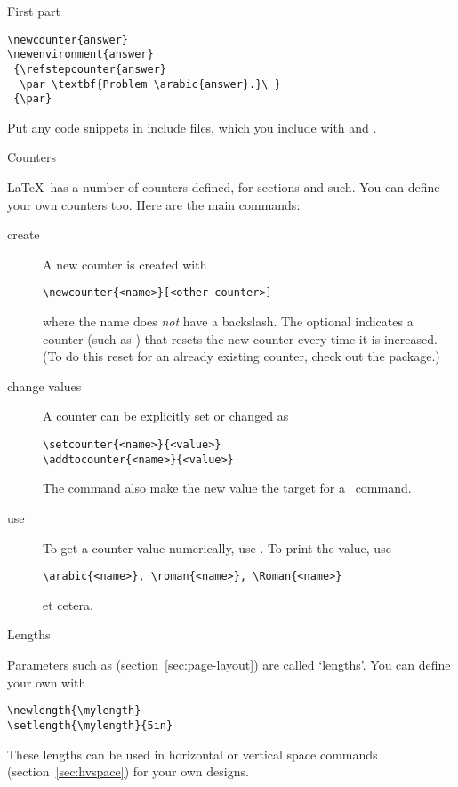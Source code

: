 \begin{answer}
First part
\begin{verbatim}
\newcounter{answer}
\newenvironment{answer}
 {\refstepcounter{answer}
  \par \textbf{Problem \arabic{answer}.}\ }
 {\par}
\end{verbatim}
Put any code snippets in include files, which you include
with  and .
\end{answer}

 {Counters}
\label{sec:counter}

\LaTeX\ has a number of counters defined, for sections and such. You
can define your own counters too. Here are the main commands:
\begin{description}
\item[create] A new counter is created with
\begin{verbatim}
\newcounter{<name>}[<other counter>]
\end{verbatim}
where the name does {\em not} have a backslash. The optional  indicates a counter (such as ) that resets the
new counter every time it is increased. (To do this reset for an
already existing counter, check out the  package.)
\item[change values] A counter can be explicitly set or changed as
\begin{verbatim}
\setcounter{<name>}{<value>}
\addtocounter{<name>}{<value>}
\end{verbatim}
The command  also make the new value the target for
a~ command.
\item[use] To get a counter value numerically, use . To
  print the value, use
\begin{verbatim}
\arabic{<name>}, \roman{<name>}, \Roman{<name>}
\end{verbatim}
et cetera.
\end{description}

 {Lengths}

Parameters such as  (section~\ref{sec:page-layout}) are
called `lengths'. You can define your own with
\begin{verbatim}
\newlength{\mylength}
\setlength{\mylength}{5in}
\end{verbatim}
These lengths can be used in horizontal or vertical space commands
(section~\ref{sec:hvspace}) for your own designs.

